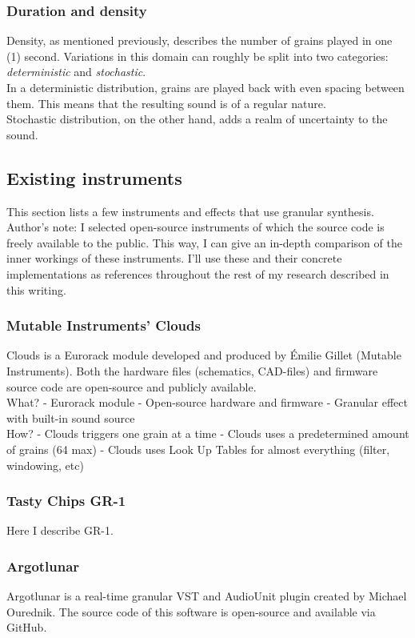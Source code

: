 \documentclass[10pt, twocolumn]{IEEEtran}
\begin{document}
\subsubsection{Duration and density}
Density, as mentioned previously, describes the number of grains played in one (1) second. Variations in this domain can roughly be split into two categories: \textit{deterministic} and \textit{stochastic}.\\
In a deterministic distribution, grains are played back with even spacing between them. This means that the resulting sound is of a regular nature.  \\

Stochastic distribution, on the other hand, adds a realm of uncertainty to the sound.

\subsection{Existing instruments}
This section lists a few instruments and effects that use granular synthesis. \\ Author's note: I selected open-source instruments of which the source code is freely available to the public. This way, I can give an in-depth comparison of the inner workings of these instruments. I'll use these and their concrete implementations as references throughout the rest of my research described in this writing.

\subsubsection{Mutable Instruments' Clouds}
Clouds is a Eurorack module developed and produced by Émilie Gillet (Mutable Instruments). Both the hardware files (schematics, CAD-files) and firmware source code are open-source and publicly available.\\
What?
- Eurorack module
- Open-source hardware and firmware
- Granular effect with built-in sound source\\
How?
- Clouds triggers one grain at a time
- Clouds uses a predetermined amount of grains (64 max)
- Clouds uses Look Up Tables for almost everything (filter, windowing, etc)

\subsubsection{Tasty Chips GR-1}
Here I describe GR-1.

\subsubsection{Argotlunar}
Argotlunar is a real-time granular VST and AudioUnit plugin created by Michael Ourednik. The source code of this software is open-source and available via GitHub.
\end{document}
